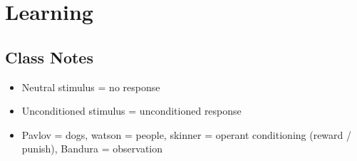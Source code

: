 \documentclass{article}
\begin{document}
\section{Learning}

\subsection{Class Notes}
\begin{itemize}
    \item Neutral stimulus = no response
    \item Unconditioned stimulus = unconditioned response
    \item Pavlov = dogs, watson = people, skinner = operant conditioning (reward / punish), Bandura = observation
\end{itemize}
\end{document}
